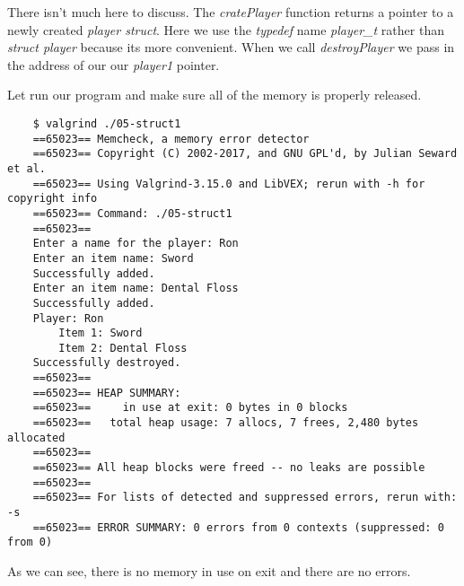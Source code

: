 \documentclass[../main.tex]{subfiles}
\begin{document}
	
	
	There isn't much here to discuss.  The \textit{cratePlayer} function returns a pointer to a newly created \textit{player struct}.  Here we use the \textit{typedef} name \textit{player\_t} rather than \textit{struct player} because its more convenient. When we call \textit{destroyPlayer} we pass in the address of our our \textit{player1} pointer.  
	
	Let run our program and make sure all of the memory is properly released.
	
	\begin{verbatim}
	$ valgrind ./05-struct1 
	==65023== Memcheck, a memory error detector
	==65023== Copyright (C) 2002-2017, and GNU GPL'd, by Julian Seward et al.
	==65023== Using Valgrind-3.15.0 and LibVEX; rerun with -h for copyright info
	==65023== Command: ./05-struct1
	==65023== 
	Enter a name for the player: Ron
	Enter an item name: Sword 
	Successfully added.
	Enter an item name: Dental Floss
	Successfully added.
	Player: Ron
	    Item 1: Sword
	    Item 2: Dental Floss
	Successfully destroyed.
	==65023== 
	==65023== HEAP SUMMARY:
	==65023==     in use at exit: 0 bytes in 0 blocks
	==65023==   total heap usage: 7 allocs, 7 frees, 2,480 bytes allocated
	==65023== 
	==65023== All heap blocks were freed -- no leaks are possible
	==65023== 
	==65023== For lists of detected and suppressed errors, rerun with: -s
	==65023== ERROR SUMMARY: 0 errors from 0 contexts (suppressed: 0 from 0)
	\end{verbatim}  
		 
	As we can see, there is no memory in use on exit and there are no errors.  
	
\end{document}
